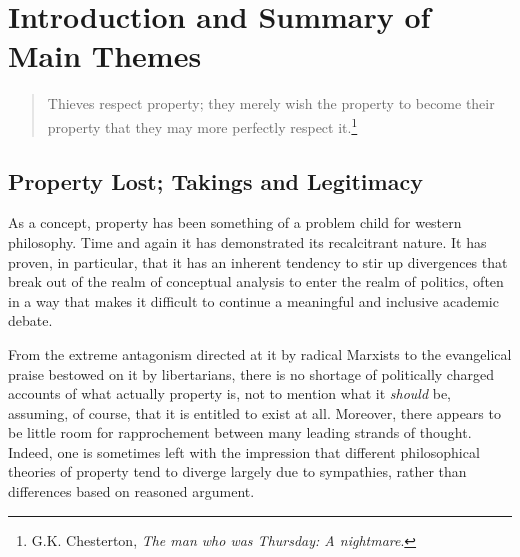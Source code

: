 \chapter{Introduction and Summary of Main Themes}\label{chap:intro}

\begin{quote}
Thieves respect property; they merely wish the property to become their property that they may more perfectly respect it.\footnote{G.K. Chesterton, {\it The man who was Thursday: A nightmare}.}
\end{quote}
%
%
%
\section{Property Lost; Takings and Legitimacy}

As a concept, property has been something of a problem child for western philosophy. Time and again it has demonstrated its recalcitrant nature. It has proven, in particular, that it has an inherent tendency to stir up divergences that break out of the realm of conceptual analysis to enter the realm of politics, often in a way that makes it difficult to continue a meaningful and inclusive academic debate.

From the extreme antagonism directed at it by radical Marxists to the evangelical praise bestowed on it by libertarians, there is no shortage of politically charged accounts of what actually property is, not to mention what it {\it should} be, assuming, of course, that it is entitled to exist at all. 
Moreover, there appears to be little room for rapprochement between many leading strands of thought. Indeed, one is sometimes left with the impression that different philosophical theories of property tend to diverge largely due to sympathies, rather than differences based on reasoned argument. %

